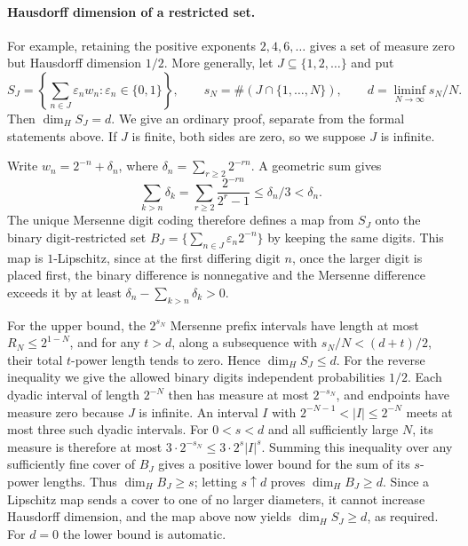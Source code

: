 \documentclass[11pt]{article}
\theoremstyle{plain}
\theoremstyle{definition}
\theoremstyle{remark}
\begin{document}
\paragraph{Hausdorff dimension of a restricted set.}
For example, retaining the positive exponents $2,4,6,\ldots$ gives
a set of measure zero but Hausdorff dimension $1/2$.  More generally,
let $J\subseteq\{1,2,\ldots\}$ and put
\[
 S_J=\left\{\sum_{n\in J}\varepsilon_nw_n:
                  \varepsilon_n\in\{0,1\}\right\},\qquad
 s_N=\#(J\cap\{1,\ldots,N\}),\qquad
 d=\liminf_{N\to\infty}s_N/N.
\]
Then $\dim_H S_J=d$. We give an ordinary proof, separate from the
formal statements above. If $J$ is finite, both sides are zero, so we
suppose $J$ is infinite.

Write $w_n=2^{-n}+\delta_n$, where
$\delta_n=\sum_{r\ge2}2^{-rn}$.  A geometric sum gives
\[
 \sum_{k>n}\delta_k
 =\sum_{r\ge2}\frac{2^{-rn}}{2^r-1}\le\delta_n/3<\delta_n.
\]
The unique Mersenne digit coding therefore defines a map from $S_J$
onto the binary digit-restricted set
$B_J=\{\sum_{n\in J}\varepsilon_n2^{-n}\}$ by keeping the same digits.
This map is $1$-Lipschitz, since at the first differing digit $n$, once
the larger digit is placed first, the binary difference is nonnegative
and the Mersenne difference exceeds it by at least
$\delta_n-\sum_{k>n}\delta_k>0$.

For the upper bound, the $2^{s_N}$ Mersenne prefix intervals have length
at most $R_N\le2^{1-N}$, and for any $t>d$, along a subsequence with
$s_N/N<(d+t)/2$, their total $t$-power length tends to zero. Hence
$\dim_H S_J\le d$. For the reverse inequality we give the allowed binary
digits independent probabilities $1/2$. Each dyadic interval of length
$2^{-N}$ then has measure at most $2^{-s_N}$, and endpoints have measure
zero because $J$ is infinite.  An interval $I$ with
$2^{-N-1}<|I|\le2^{-N}$ meets at most three such dyadic intervals.
For $0<s<d$ and all sufficiently large $N$, its measure is therefore
at most $3\cdot2^{-s_N}\le3\cdot2^s|I|^s$.
Summing this inequality over any sufficiently fine cover of $B_J$
gives a positive lower bound for the sum of its $s$-power lengths.
Thus $\dim_H B_J\ge s$; letting $s\uparrow d$ proves
$\dim_H B_J\ge d$. Since a Lipschitz map sends a cover to one of no
larger diameters, it cannot increase Hausdorff dimension, and the map
above now yields $\dim_H S_J\ge d$, as required.
For $d=0$ the lower bound is automatic.
\end{document}
